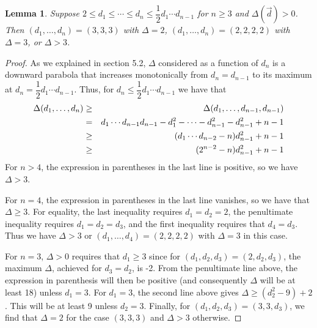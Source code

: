 \documentclass[12pt]{article}
\newtheorem{lemma}[theorem]{Lemma}
\theoremstyle{definition}
\newcommand{\beas}{\begin{eqnarray*}}
\newcommand{\eeas}{\end{eqnarray*}}
\begin{document}
\begin{lemma} 
Suppose $2 \le d_1 \le \cdots \le d_n \le \dfrac{1}{2} d_1 \cdots d_{n-1}$ for $n \ge 3$ and $\Delta(\vec{d}) > 0$. Then $(d_1, \dots, d_n) = (3,3,3)$ with $\Delta = 2$, $(d_1, \dots, d_n) = (2,2,2,2)$ with $\Delta = 3$, or $\Delta > 3$.
\end{lemma}
\begin{proof}
As we explained in section 5.2, $\Delta$ considered as a function of $d_n$ is a downward parabola that increases monotonically from $d_n = d_{n-1}$ to its maximum at $d_n = \dfrac{1}{2} d_1 \cdots d_{n-1}$. Thus, for $d_n \le \dfrac{1}{2} d_1 \cdots d_{n-1}$ we have that
\beas
\Delta(d_1, \dots, d_n) &\ge& \Delta(d_1, \dots, d_{n-1}, d_{n-1}) \cr
 &=& d_1 \cdots d_{n-1} d_{n-1} - d_1^2 - \cdots - d_{n-1}^2 - d_{n-1}^2 + n - 1 \cr
 &\ge& (d_1 \cdots d_{n-2} - n)d_{n-1}^2  + n - 1 \cr
 &\ge& (2^{n-2} - n)d_{n-1}^2  + n - 1
\eeas
For $n > 4$, the expression in parentheses in the last line is positive, so we have $\Delta > 3$. 

For $n=4$, the expression in parentheses in the last line vanishes, so we have that $\Delta \ge 3$. For equality, the last inequality requires $d_1 = d_2 = 2$, the penultimate inequality requires $d_1 = d_2 = d_3$, and the first inequality requires that $d_4 = d_3$. Thus we have $\Delta > 3$ or $(d_1, \dots, d_4) = (2,2,2,2)$ with $\Delta = 3$ in this case.

For $n=3$, $\Delta > 0$ requires that $d_1 \ge 3$ since for $(d_1,d_2,d_3) = (2,d_2,d_3)$, the maximum $\Delta$, achieved for $d_3 = d_2$, is -2. From the penultimate line above, the expression in parenthesis will then be positive (and consequently $\Delta$ will be at least 18) unless $d_1 = 3$. For $d_1 = 3$, the second line above gives $\Delta \ge (d_2^2 - 9) + 2$. This will be at least 9 unless $d_2 = 3$. Finally, for $(d_1,d_2,d_3) = (3,3,d_3)$, we find that $\Delta = 2$ for the case $(3,3,3)$ and $\Delta > 3$ otherwise. 
\end{proof} 
\end{document}
